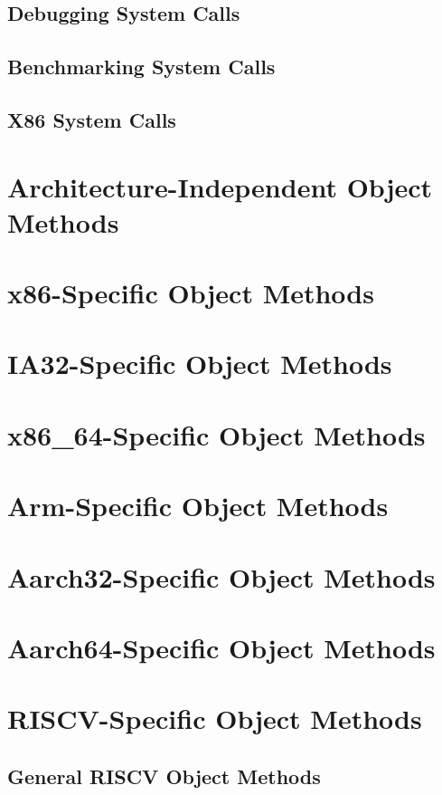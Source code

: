 \subsection{Debugging System Calls}
\clearpage

\subsection{Benchmarking System Calls}
\clearpage

\subsection{X86 System Calls}
\clearpage

\section{Architecture-Independent Object Methods}
\label{sec:kobj_api}

\ifxeightsix

\clearpage

\section{x86-Specific Object Methods}
\clearpage

\section{IA32-Specific Object Methods}
\clearpage

\section{x86\_64-Specific Object Methods}

\fi

\clearpage

\section{Arm-Specific Object Methods}

\clearpage

\section{Aarch32-Specific Object Methods}
\clearpage

\section{Aarch64-Specific Object Methods}
\clearpage

\section{RISCV-Specific Object Methods}
\subsection{General RISCV Object Methods}
